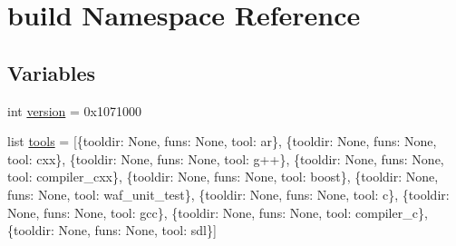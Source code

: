 \hypertarget{namespacebuild}{}\section{build Namespace Reference}
\label{namespacebuild}
\subsection*{Variables}
\begin{DoxyCompactItemize}
\item 
int \hyperlink{namespacebuild_a7f0275d8b2a512614212a6fc5e8c4b0a}{version} = 0x1071000
\item 
list \hyperlink{namespacebuild_a8d578fd8c3ff6abc23ecff7ba61fc3dd}{tools} = \mbox{[}\{\textquotesingle{}tooldir\textquotesingle{}\+: None, \textquotesingle{}funs\textquotesingle{}\+: None, \textquotesingle{}tool\textquotesingle{}\+: \textquotesingle{}ar\textquotesingle{}\}, \{\textquotesingle{}tooldir\textquotesingle{}\+: None, \textquotesingle{}funs\textquotesingle{}\+: None, \textquotesingle{}tool\textquotesingle{}\+: \textquotesingle{}cxx\textquotesingle{}\}, \{\textquotesingle{}tooldir\textquotesingle{}\+: None, \textquotesingle{}funs\textquotesingle{}\+: None, \textquotesingle{}tool\textquotesingle{}\+: \textquotesingle{}g++\textquotesingle{}\}, \{\textquotesingle{}tooldir\textquotesingle{}\+: None, \textquotesingle{}funs\textquotesingle{}\+: None, \textquotesingle{}tool\textquotesingle{}\+: \textquotesingle{}compiler\+\_\+cxx\textquotesingle{}\}, \{\textquotesingle{}tooldir\textquotesingle{}\+: None, \textquotesingle{}funs\textquotesingle{}\+: None, \textquotesingle{}tool\textquotesingle{}\+: \textquotesingle{}boost\textquotesingle{}\}, \{\textquotesingle{}tooldir\textquotesingle{}\+: None, \textquotesingle{}funs\textquotesingle{}\+: None, \textquotesingle{}tool\textquotesingle{}\+: \textquotesingle{}waf\+\_\+unit\+\_\+test\textquotesingle{}\}, \{\textquotesingle{}tooldir\textquotesingle{}\+: None, \textquotesingle{}funs\textquotesingle{}\+: None, \textquotesingle{}tool\textquotesingle{}\+: \textquotesingle{}c\textquotesingle{}\}, \{\textquotesingle{}tooldir\textquotesingle{}\+: None, \textquotesingle{}funs\textquotesingle{}\+: None, \textquotesingle{}tool\textquotesingle{}\+: \textquotesingle{}gcc\textquotesingle{}\}, \{\textquotesingle{}tooldir\textquotesingle{}\+: None, \textquotesingle{}funs\textquotesingle{}\+: None, \textquotesingle{}tool\textquotesingle{}\+: \textquotesingle{}compiler\+\_\+c\textquotesingle{}\}, \{\textquotesingle{}tooldir\textquotesingle{}\+: None, \textquotesingle{}funs\textquotesingle{}\+: None, \textquotesingle{}tool\textquotesingle{}\+: \textquotesingle{}sdl\textquotesingle{}\}\mbox{]}
\end{DoxyCompactItemize}


